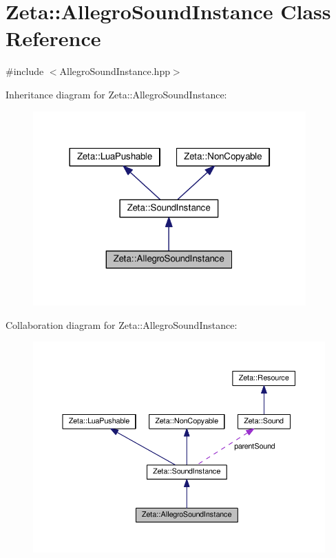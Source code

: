 \hypertarget{classZeta_1_1AllegroSoundInstance}{\section{Zeta\+:\+:Allegro\+Sound\+Instance Class Reference}
\label{classZeta_1_1AllegroSoundInstance}
}


{\ttfamily \#include $<$Allegro\+Sound\+Instance.\+hpp$>$}



Inheritance diagram for Zeta\+:\+:Allegro\+Sound\+Instance\+:\nopagebreak
\begin{figure}[H]
\begin{center}
\leavevmode
\includegraphics[width=297pt]{classZeta_1_1AllegroSoundInstance__inherit__graph}
\end{center}
\end{figure}


Collaboration diagram for Zeta\+:\+:Allegro\+Sound\+Instance\+:\nopagebreak
\begin{figure}[H]
\begin{center}
\leavevmode
\includegraphics[width=350pt]{classZeta_1_1AllegroSoundInstance__coll__graph}
\end{center}
\end{figure}
